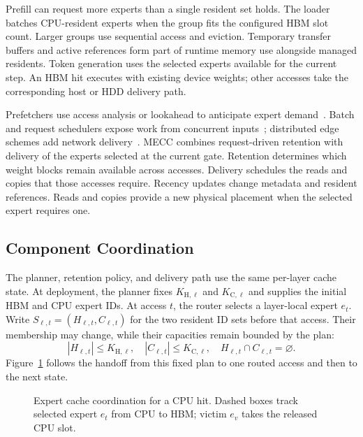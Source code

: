 Prefill can request more experts than a single resident set holds.
The loader batches CPU-resident experts when the group fits the configured HBM slot count.
Larger groups use sequential access and eviction.
Temporary transfer buffers and active references form part of runtime memory use alongside managed residents.
Token generation uses the selected experts available for the current step.
An HBM hit executes with existing device weights; other accesses take the corresponding host or HDD delivery path.

Prefetchers use access analysis or lookahead to anticipate expert demand~\cite{pregated,fate,expertflow}.
Batch and request schedulers expose work from concurrent inputs~\cite{klotski,bevy}; distributed edge schemes add network delivery~\cite{odmoe}.
MECC combines request-driven retention with delivery of the experts selected at the current gate.
Retention determines which weight blocks remain available across accesses.
Delivery schedules the reads and copies that those accesses require.
Recency updates change metadata and resident references. Reads and copies provide a new physical placement when the selected expert requires one.

\newpage
\subsection{Component Coordination}
\label{sec:coordination}
The planner, retention policy, and delivery path use the same per-layer cache state.
At deployment, the planner fixes $K_{\mathrm H,\ell}$ and $K_{\mathrm C,\ell}$ and supplies the initial HBM and CPU expert IDs.
At access $t$, the router selects a layer-local expert $e_t$.
Write $S_{\ell,t}=(H_{\ell,t},C_{\ell,t})$ for the two resident ID sets before that access.
Their membership may change, while their capacities remain bounded by the plan:
\begin{equation}
|H_{\ell,t}|\le K_{\mathrm H,\ell},\quad
|C_{\ell,t}|\le K_{\mathrm C,\ell},\quad
H_{\ell,t}\cap C_{\ell,t}=\varnothing.
\end{equation}
Figure~\ref{fig:coordination} follows the handoff from this fixed plan to one routed access and then to the next state.

\begin{figure}[H]
\centering
\par\nointerlineskip
\caption{Expert cache coordination for a CPU hit. Dashed boxes track selected expert $e_t$ from CPU to HBM; victim $e_v$ takes the released CPU slot.}
\label{fig:coordination}
\end{figure}

